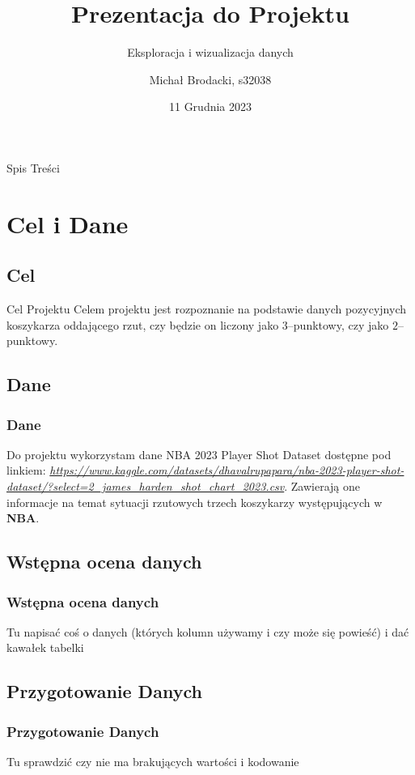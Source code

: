 \documentclass{beamer}
\title{Prezentacja do Projektu}
\subtitle{Eksploracja i wizualizacja danych}
\author{Michał Brodacki, s32038}
\institute{Polsko--Japońska Akademia Technik Komputerowych}
\date{11 Grudnia 2023}
\begin{document}
	\begin{frame}
		\titlepage
	\end{frame}
	\begin{frame}{Spis Treści}
		\tableofcontents %
	\end{frame}
	
	\section{Cel i Dane}
	\subsection{Cel}
	\begin{frame}
		\begin{block}{Cel Projektu}
		Celem projektu jest rozpoznanie na podstawie danych pozycyjnych koszykarza oddającego rzut, czy będzie on liczony jako $3$--punktowy, czy jako $2$--punktowy.
		\end{block}

	\end{frame}
	\subsection{Dane}
\begin{frame}
	\frametitle{Dane}
Do projektu wykorzystam dane NBA 2023 Player Shot Dataset dostępne pod linkiem: 
\textit{\url{https://www.kaggle.com/datasets/dhavalrupapara/nba-2023-player-shot-dataset/?select=2_james_harden_shot_chart_2023.csv}}. Zawierają one informacje na temat sytuacji rzutowych trzech koszykarzy występujących w \textbf{NBA}.
\end{frame}

	\subsection{Wstępna ocena danych}
\begin{frame}
	\frametitle{Wstępna ocena danych}
	Tu napisać coś o danych (których kolumn używamy i czy może się powieść) i dać kawałek tabelki
	
\end{frame}
\subsection{Przygotowanie Danych}
	\begin{frame}
		\frametitle{Przygotowanie Danych}
		Tu sprawdzić czy nie ma brakujących wartości i kodowanie
		
	\end{frame}
\end{document}
